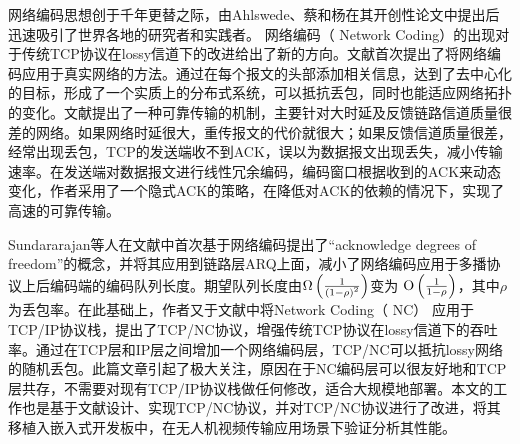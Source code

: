 网络编码思想创于千年更替之际，由Ahlswede、蔡和杨在其开创性论文\cite{Ahlswede2000}中提出后迅速吸引了世界各地的研究者和实践者。
网络编码（ Network Coding）的出现对于传统TCP协议在lossy信道下的改进给出了新的方向。文献\cite{chou2003practical}首次提出了将网络编码应用于真实网络的方法。通过在每个报文的头部添加相关信息，达到了去中心化的目标，形成了一个实质上的分布式系统，可以抵抗丢包，同时也能适应网络拓扑的变化。文献\cite{ontheflycoding}提出了一种可靠传输的机制，主要针对大时延及反馈链路信道质量很差的网络。如果网络时延很大，重传报文的代价就很大；如果反馈信道质量很差，经常出现丢包，TCP的发送端收不到ACK，误以为数据报文出现丢失，减小传输速率。在发送端对数据报文进行线性冗余编码，编码窗口根据收到的ACK来动态变化，作者采用了一个隐式ACK的策略，在降低对ACK的依赖的情况下，实现了高速的可靠传输。
\par
Sundararajan等人在文献\cite{4595268}中首次基于网络编码提出了“acknowledge degrees of freedom”的概念，并将其应用到链路层ARQ上面，减小了网络编码应用于多播协议上后编码端的编码队列长度。期望队列长度由$\Omega \left( {\frac{1}{{{{\left( {1{\rm{ - }}\rho } \right)}^2}}}} \right)$变为
${\rm O}\left( {\frac{1}{{1{\rm{ - }}\rho }}} \right)$，其中$\rho$为丢包率。在此基础上，作者又于文献\cite{Sundararajan2009}中将Network Coding（ NC） 应用于TCP/IP协议栈，提出了TCP/NC协议，增强传统TCP协议在lossy信道下的吞吐率。通过在TCP层和IP层之间增加一个网络编码层，TCP/NC可以抵抗lossy网络的随机丢包。此篇文章引起了极大关注，原因在于NC编码层可以很友好地和TCP层共存，不需要对现有TCP/IP协议栈做任何修改，适合大规模地部署。本文的工作也是基于文献\cite{Sundararajan2009,Sundararajan2011}设计、实现TCP/NC协议，并对TCP/NC协议进行了改进，将其移植入嵌入式开发板中，在无人机视频传输应用场景下验证分析其性能。

